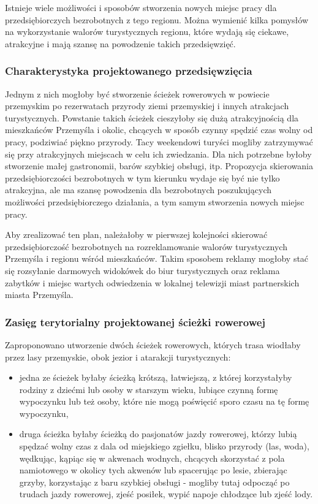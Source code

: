 \documentclass{sprawozdanie-agh}
\begin{document}
		Istnieje wiele możliwości i sposobów stworzenia nowych miejsc pracy dla przedsiębiorczych bezrobotnych z tego regionu. Można wymienić kilka pomysłów na wykorzystanie walorów turystycznych regionu, które wydają się ciekawe, atrakcyjne i mają szansę na powodzenie takich przedsięwzięć.
		
		\subsubsection{Charakterystyka projektowanego przedsięwzięcia}
		Jednym z nich mogłoby być stworzenie ścieżek rowerowych w powiecie przemyskim po rezerwatach przyrody ziemi przemyskiej i innych atrakcjach turystycznych. Powstanie takich ścieżek cieszyłoby się dużą atrakcyjnością dla mieszkańców Przemyśla i okolic, chcących w sposób czynny spędzić czas wolny od pracy, podziwiać piękno przyrody. Tacy weekendowi turyści mogliby zatrzymywać się przy atrakcyjnych miejscach w celu ich zwiedzania. Dla nich potrzebne byłoby stworzenie małej gastronomii, barów szybkiej obsługi, itp. Propozycja skierowania przedsiębiorczości bezrobotnych w tym kierunku wydaje się być nie tylko atrakcyjna, ale ma szansę powodzenia dla bezrobotnych poszukujących możliwości przedsiębiorczego działania, a tym samym stworzenia nowych miejsc pracy.
		
		Aby zrealizować ten plan, należałoby w pierwszej kolejności skierować przedsiębiorczość bezrobotnych na rozreklamowanie walorów turystycznych Przemyśla i regionu wśród mieszkańców. Takim sposobem reklamy mogłoby stać się rozsyłanie darmowych widokówek do biur turystycznych oraz reklama zabytków i miejsc wartych odwiedzenia w lokalnej telewizji miast partnerskich miasta Przemyśla.
		
		\subsubsection{Zasięg terytorialny projektowanej ścieżki rowerowej}
		Zaproponowano utworzenie dwóch ścieżek rowerowych, których trasa wiodłaby przez lasy przemyskie, obok jezior i atarakcji turystycznych:
		\begin{itemize}
			\item jedna ze ścieżek byłaby ścieżką krótszą, łatwiejszą, z której korzystałyby rodziny z dziećmi lub osoby w starszym wieku, lubiące czynną formę wypoczynku lub też osoby, które nie mogą poświęcić sporo czasu na tę formę wypoczynku,
			\item druga ścieżka byłaby ścieżką do pasjonatów jazdy rowerowej, którzy lubią spędzać wolny czas z dala od miejskiego zgiełku, blisko przyrody (las, woda), wędkując, kąpiąc się w akwenach wodnych, chcących skorzystać z pola namiotowego w okolicy tych akwenów lub spacerując po lesie, zbierając grzyby, korzystając z baru szybkiej obsługi - mogliby tutaj odpocząć po trudach jazdy rowerowej, zjeść posiłek, wypić napoje chłodzące lub zjeść lody.
		\end{itemize}
	
\end{document}
